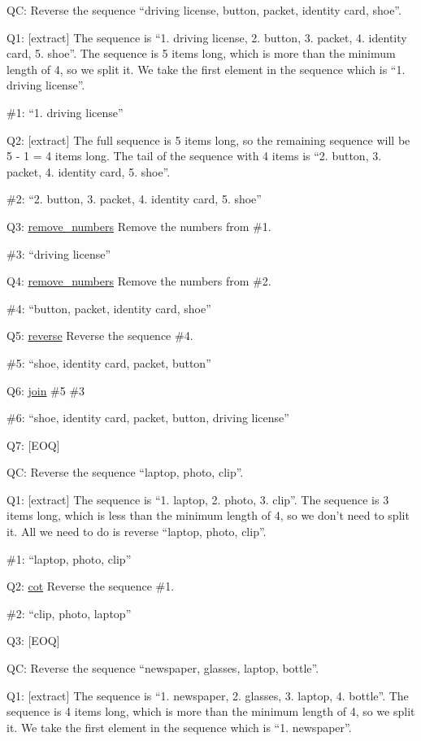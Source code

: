 \documentclass[
]{article}
\begin{document}
QC: Reverse the sequence ``driving license, button, packet, identity
card, shoe''.

Q1: {[}extract{]} The sequence is ``1. driving license, 2. button, 3.
packet, 4. identity card, 5. shoe''. The sequence is 5 items long, which
is more than the minimum length of 4, so we split it. We take the first
element in the sequence which is ``1. driving license''.

\#1: ``1. driving license''

Q2: {[}extract{]} The full sequence is 5 items long, so the remaining
sequence will be 5 - 1 = 4 items long. The tail of the sequence with 4
items is ``2. button, 3. packet, 4. identity card, 5. shoe''.

\#2: ``2. button, 3. packet, 4. identity card, 5. shoe''

Q3: \hyperref[remove_numbers]{remove\_numbers} Remove the numbers from
\#1.

\#3: ``driving license''

Q4: \hyperref[remove_numbers]{remove\_numbers} Remove the numbers from
\#2.

\#4: ``button, packet, identity card, shoe''

Q5: \hyperref[reverse]{reverse} Reverse the sequence \#4.

\#5: ``shoe, identity card, packet, button''

Q6: \hyperref[join]{join} \#5 \#3

\#6: ``shoe, identity card, packet, button, driving license''

Q7: {[}EOQ{]}

QC: Reverse the sequence ``laptop, photo, clip''.

Q1: {[}extract{]} The sequence is ``1. laptop, 2. photo, 3. clip''. The
sequence is 3 items long, which is less than the minimum length of 4, so
we don't need to split it. All we need to do is reverse ``laptop, photo,
clip''.

\#1: ``laptop, photo, clip''

Q2: \hyperref[cot]{cot} Reverse the sequence \#1.

\#2: ``clip, photo, laptop''

Q3: {[}EOQ{]}

QC: Reverse the sequence ``newspaper, glasses, laptop, bottle''.

Q1: {[}extract{]} The sequence is ``1. newspaper, 2. glasses, 3. laptop,
4. bottle''. The sequence is 4 items long, which is more than the
minimum length of 4, so we split it. We take the first element in the
sequence which is ``1. newspaper''.
\end{document}
